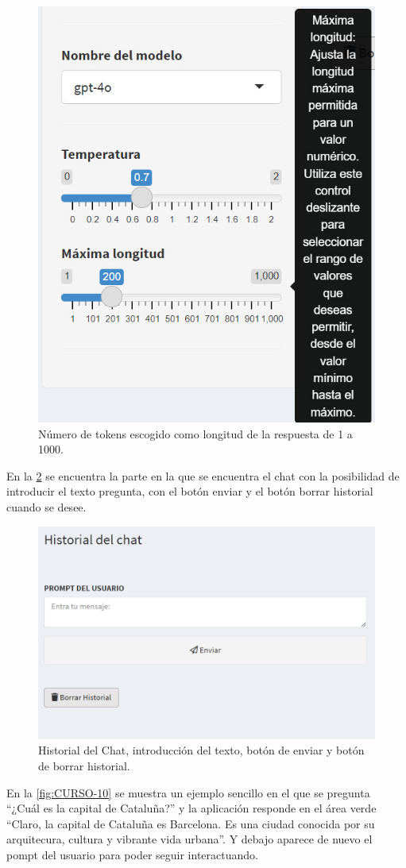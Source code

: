 \documentclass[
]{book}
\begin{document}
\begin{figure}

{\centering \includegraphics[width=0.6\linewidth]{FIG9} 

}

\caption{Número de tokens escogido como longitud de la respuesta de 1 a 1000.}\label{fig:CURSO-8}
\end{figure}

En la \ref{fig:CURSO-9} se encuentra la parte en la que se encuentra el chat con la posibilidad de introducir el texto pregunta, con el botón enviar y el botón borrar historial cuando se desee.

\begin{figure}

{\centering \includegraphics[width=0.6\linewidth]{FIG10} 

}

\caption{Historial del Chat, introducción del texto, botón de enviar y botón de borrar historial.}\label{fig:CURSO-9}
\end{figure}

En la \ref{fig:CURSO-10} se muestra un ejemplo sencillo en el que se pregunta ``¿Cuál es la capital de Cataluña?'' y la aplicación responde en el área verde ``Claro, la capital de Cataluña es Barcelona. Es una ciudad conocida por su arquitecura, cultura y vibrante vida urbana''. Y debajo aparece de nuevo el pompt del usuario para poder seguir interactuando.
\end{document}
